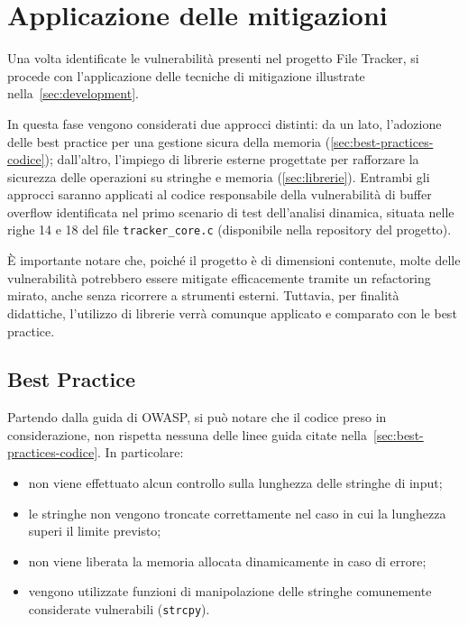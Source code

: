 \section{Applicazione delle mitigazioni}
\label{sec:mitigation_techniques}

Una volta identificate le vulnerabilità presenti nel progetto File Tracker, si
procede con l'applicazione delle tecniche di mitigazione illustrate nella~\autoref{sec:development}.

In questa fase vengono considerati due approcci distinti: da un lato, l'adozione
delle best practice per una gestione sicura della memoria (\autoref{sec:best-practices-codice});
dall'altro, l'impiego di librerie esterne progettate per rafforzare la sicurezza
delle operazioni su stringhe e memoria (\autoref{sec:librerie}). Entrambi gli approcci
saranno applicati al codice responsabile della vulnerabilità di buffer overflow identificata
nel primo scenario di test dell'analisi dinamica, situata nelle righe 14 e 18
del file \texttt{tracker\_core.c} (disponibile nella repository del progetto).

È importante notare che, poiché il progetto è di dimensioni contenute, molte delle
vulnerabilità potrebbero essere mitigate efficacemente tramite un refactoring mirato,
anche senza ricorrere a strumenti esterni. Tuttavia, per finalità didattiche, l'utilizzo
di librerie verrà comunque applicato e comparato con le best practice.

\subsection*{Best Practice}
\label{sec:best-practices-case-study}

Partendo dalla guida di OWASP\cite{owasp_best_practices}, si può notare che il
codice preso in considerazione, non rispetta nessuna delle linee guida citate nella~\autoref{sec:best-practices-codice}.
In particolare:
\begin{itemize}
  \item non viene effettuato alcun controllo sulla lunghezza delle stringhe di input;

  \item le stringhe non vengono troncate correttamente nel caso in cui la lunghezza
    superi il limite previsto;

  \item non viene liberata la memoria allocata dinamicamente in caso di errore;

  \item vengono utilizzate funzioni di manipolazione delle stringhe comunemente considerate
    vulnerabili (\texttt{strcpy}).
\end{itemize}

